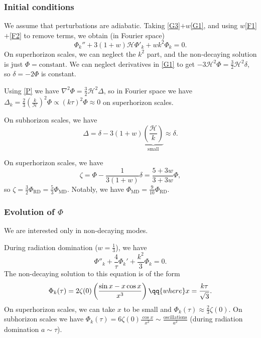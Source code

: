 \documentclass{jknotes}
\begin{document}
\subsubsection*{Initial conditions}
We assume that perturbations are adiabatic. Taking \eqref{G3}\(+w\)\eqref{G1}, and using \(w\)\eqref{F1}\(+\)\eqref{F2} to remove terms, we obtain (in Fourier space)
\begin{equation}
    \Phi_k'' + 3(1+w)\mathcal{H}\Phi'_k + wk^2\Phi_k=0.
\end{equation}
On superhorizon scales, we can neglect the \(k^2\) part, and the non-decaying solution is just \(\Phi=\text{constant}\). We can neglect derivatives in \eqref{G1} to get \(-3\mathcal{H}^2\Phi=\frac32\mathcal{H}^2\delta\), so \(\delta = -2\Phi\) is constant. 

Using \eqref{P} we have \(\nabla^2\Phi = \frac32\mathcal{H}^2\Delta\), so in Fourier space we have \(\Delta_k= \frac23\left(\frac{k}{\mathcal{H}}\right)^2\Phi \propto (k\tau)^2 \Phi \approx 0\) on superhorizon scales.

On subhorizon scales, we have
\begin{equation}
    \Delta = \delta - 3(1+w)\underbrace{\left(\frac{\mathcal{H}}{k}\right)}_{\text{small}} \approx \delta.
\end{equation}

On superhorizon scales, we have
\begin{equation}
    \zeta = \Phi - \frac{1}{3(1+w)}\delta = \frac{5+3w}{3+3w}\Phi,
\end{equation}
so \(\zeta = \frac32\Phi_{\text{RD}} = \frac53\Phi_{\text{MD}}\). Notably, we have \(\Phi_{\text{MD}}=\frac9{10}\Phi_{\text{RD}}\).

\subsubsection*{Evolution of \texorpdfstring{$\Phi$}{Phi}}
We are interested only in non-decaying modes. 

During radiation domination (\(w=\frac{1}{3}\)), we have
\begin{equation}
    \Phi''_k + \frac{4}{\tau}\Phi_k' + \frac{k^2}{3}\Phi_k = 0.
\end{equation}
The non-decaying solution to this equation is of the form
\begin{equation}
    \Phi_k(\tau) = 2\zeta(0)\left(\frac{\sin x-x\cos x}{x^3}\right) \qq{where} x = \frac{k\tau}{\sqrt{3}}.
\end{equation}
On superhorizon scales, we can take \(x\) to be small and \(\Phi_k(\tau)\approx \frac23\zeta(0)\). On subhorizon scales we have \(\Phi_k(\tau) = 6\zeta(0)\frac{\cos x}{x^2} \sim \frac{\text{oscillations}}{a^2}\) (during radiation domination \(a \sim \tau\)).
\end{document}
